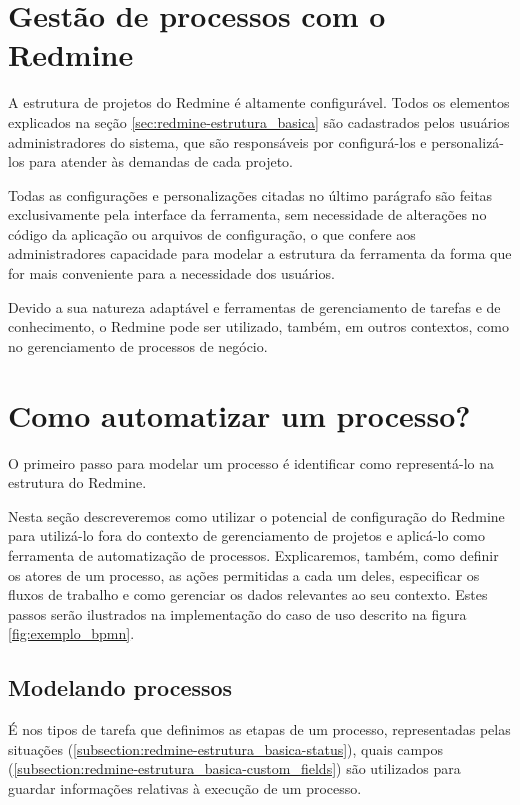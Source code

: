 \section{Gestão de processos com o Redmine}\label{sec:redmine-gestao_processos}

A estrutura de projetos do Redmine é altamente configurável. Todos os elementos explicados na seção \ref{sec:redmine-estrutura_basica} são cadastrados pelos usuários administradores do sistema, que são responsáveis por configurá-los e personalizá-los para atender às demandas de cada projeto.

Todas as configurações e personalizações citadas no último parágrafo são feitas exclusivamente pela interface da ferramenta, sem necessidade de alterações no código da aplicação ou arquivos de configuração, o que confere aos administradores capacidade para modelar a estrutura da ferramenta da forma que for mais conveniente para a necessidade dos usuários.

Devido a sua natureza adaptável e ferramentas de gerenciamento de tarefas e de conhecimento, o Redmine pode ser utilizado, também, em outros contextos, como no gerenciamento de processos de negócio.


\section{Como automatizar um processo?}\label{sec:redmine-automatizar_processo}

O primeiro passo para modelar um processo é identificar como representá-lo na estrutura do Redmine.

Nesta seção descreveremos como utilizar o potencial de configuração do Redmine para utilizá-lo fora do contexto de gerenciamento de projetos e aplicá-lo como ferramenta de automatização de processos. Explicaremos, também, como definir os atores de um processo, as ações permitidas a cada um deles, especificar os fluxos de trabalho e como gerenciar os dados relevantes ao seu contexto. Estes passos serão ilustrados na implementação do caso de uso descrito na figura \ref{fig:exemplo_bpmn}.


\subsection{Modelando processos}\label{subsection:redmine-automatizar_processo-criacao}

É nos tipos de tarefa que definimos as etapas de um processo, representadas pelas situações (\ref{subsection:redmine-estrutura_basica-status}), quais campos (\ref{subsection:redmine-estrutura_basica-custom_fields}) são utilizados para guardar informações relativas à execução de um processo.

